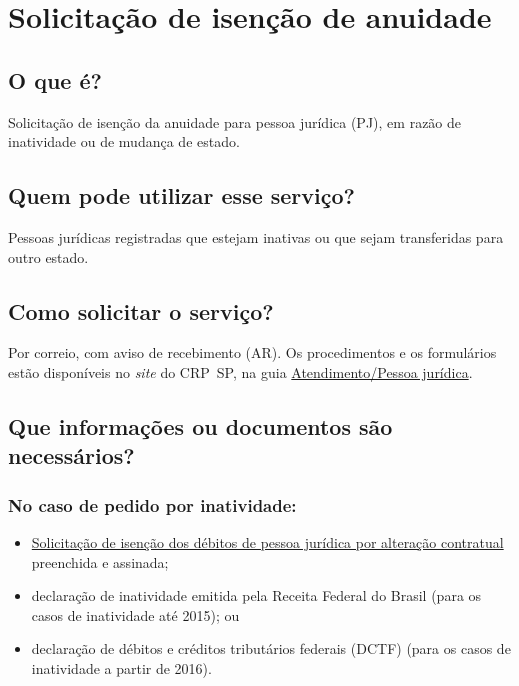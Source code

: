 \chapter{Solicitação de isenção de anuidade}
\label{chap:pj-isencao}

\section{O que é?}

Solicitação de isenção da anuidade para pessoa jurídica (PJ), em razão de inatividade ou de mudança de estado.

\section{Quem pode utilizar esse serviço?}

Pessoas jurídicas registradas que estejam inativas ou que sejam transferidas para outro estado.

\section{Como solicitar o serviço?}

Por correio, com aviso de recebimento (AR). Os procedimentos e os formulários estão disponíveis no \emph{site} do CRP~SP, na guia \href{https://www.crpsp.org/pagina/view/30}{Atendimento/Pessoa jurídica}.

\section{Que informações ou documentos são necessários?}

\subsection{No caso de pedido por inatividade:}

\begin{itemize}
  \item  \hyperref[]{Solicitação  de isenção dos débitos de pessoa jurídica por alteração contratual}  preenchida e assinada;
  \item  declaração de inatividade emitida pela Receita Federal do Brasil (para  os casos de inatividade até 2015); ou
  \item  declaração de débitos e créditos tributários federais (DCTF) (para os  casos de inatividade a partir de 2016).
\end{itemize}

